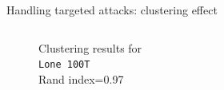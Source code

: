 
\begin{frame}{Handling targeted attacks: clustering effect}
  \begin{columns}
    \begin{column}{.4\textwidth}
    
      \vspace{-0.5cm}
      \begin{figure}
        \captionsetup{justification=centering}
        \caption{Clustering results for\\
        \texttt{Lone 100T}\\ 
        Rand index=0.97}
      \end{figure}


\end{column}
\end{columns}
\end{frame}
